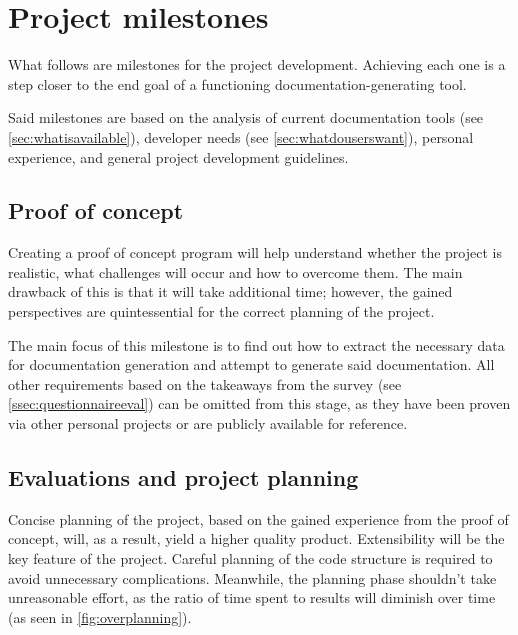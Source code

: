\chapter{Project milestones}

What follows are milestones for the project development.
Achieving each one is a step closer to the end goal of a functioning documentation-generating tool.

Said milestones are based on the analysis of current documentation tools (see \ref{sec:whatisavailable}), developer needs (see \ref{sec:whatdouserswant}), personal experience, and general project development guidelines.

\section{Proof of concept}

Creating a proof of concept program will help understand whether the project is realistic, what challenges will occur and how to overcome them.
The main drawback of this is that it will take additional time; however, the gained perspectives are quintessential for the correct planning of the project.

The main focus of this milestone is to find out how to extract the necessary data for documentation generation and attempt to generate said documentation.
All other requirements based on the takeaways from the survey (see \ref{ssec:questionnaireeval}) can be omitted from this stage, as they have been proven via other personal projects or are publicly available for reference.

\section{Evaluations and project planning}

Concise planning of the project, based on the gained experience from the proof of concept, will, as a result, yield a higher quality product.
Extensibility will be the key feature of the project. Careful planning of the code structure is required to avoid unnecessary complications.
Meanwhile, the planning phase shouldn't take unreasonable effort, as the ratio of time spent to results will diminish over time (as seen in \ref{fig:overplanning}). \cite{ruparelia_stop_2016}

